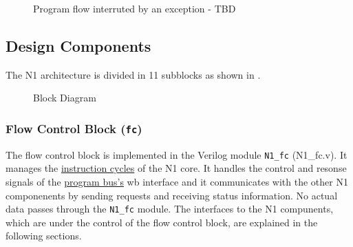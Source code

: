 \begin{figure}[!h]
\begin{center}
{{
    }
  }
  \caption{Program flow interruted by an exception - TBD}
  \label{architecture:excyc:excpt:fig}
  \end{center}
\end{figure}


\subsection{Design Components}
\label{architecture:comp}

The N1 architecture is divided in 11 subblocks as shown in .

\begin{figure}[!h]
  \begin{center}
  \caption{Block Diagram}
  \label{architecture:comp:fig}
  \end{center}
\end{figure}


\subsubsection{Flow Control Block (\texttt{fc})}
\label{architecture:fc}

The flow control block is implemented in the Verilog module \texttt{N1\_fc} (N1\_fc.v).
It manages the  \hyperref[architecture:excyc]{instruction cycles} of the N1 core.
It handles the control and resonse signals of the  \hyperref[integration:if:pbus]{program bus's} \gls{wb} interface and
it communicates with the other N1 componenents by sending requests and receiving status information.
No actual data passes through the \texttt{N1\_fc} module.
The interfaces to the N1 compunents, which are under the control of the flow control block, are explained in the following sections.

